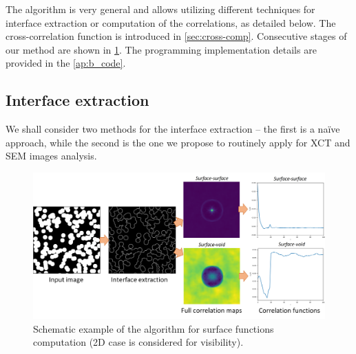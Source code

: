 \documentclass[reprint,amsmath,amssymb,aps,pre,showkeys,showpacs]{revtex4-1}
\begin{document}
The algorithm is very general and allows utilizing different techniques for
interface extraction or computation of the correlations, as detailed below. The
cross-correlation function is introduced in \cref{sec:cross-comp}. Consecutive
stages of our method are shown in \cref{fig:stages}. The programming
implementation details are provided in the \cref{ap:b_code}.

\subsection{Interface extraction}
We shall consider two methods for the interface extraction -- the first is a
naïve approach, while the second is the one we propose to routinely apply for
XCT and SEM images analysis.

\begin{figure}[!pt]
  \centering
  \includegraphics[width=0.6\linewidth]{images/algo.png}
  \caption[]{Schematic example of the algorithm for surface
  functions computation (2D case is considered for visibility).}
  \label{fig:stages}
\end{figure}
\end{document}

